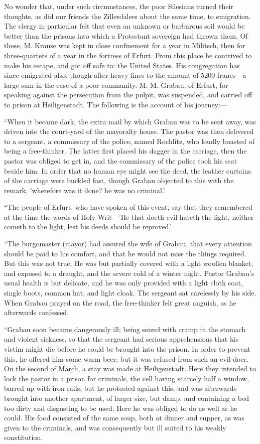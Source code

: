 No wonder that, under such circumstances, the poor
Silesians turned their thoughts, as did our friends the Zillerdalers
about the same time, to emigration. The clergy in particular felt that
even an unknown or barbarous soil would be better than the prisons into
which a Protestant sovereign had thrown them. Of these, M. Krause was
kept in close confinement for a year in Militsch, then for
three-quarters of a year in the fortress of Erfurt. From this place he
contrived to make his escape, and got off safe to: the United States.
His congregation has since emigrated also, though after heavy fines to
the amount of 5200 francs—a large sum in the case of a poor community.
M. M. Grabau, of Erfurt, for speaking against the persecution from the
pulpit, was suspended, and carried off to prison at Heiligenstadt. The
following is the account of his journey:—

``When it became dark, the extra mail
by which Grabau was to be sent away, was driven into the court-yard of
the mayoralty house. The pastor was then delivered to a sergeant, a
commissary of the police, named Rochlitz, who loudly boasted of being a
free-thinker. The latter first placed his dagger in the carriage, then
the pastor was obliged to get in, and the commissary of the police took
his seat beside him. In order that no human
eye might see the deed, the leather curtains of the carriage were
buckled fast, though Grabau objected to this with the remark, 'wherefore
was it done? he was no criminal.'

``The people of Erfurt, who have
spoken of this event, say that they remembered at the time the words of
Holy Writ—'He that doeth evil hateth the light, neither cometh to the
light, lest his deeds should be reproved.'

``The burgomaster (mayor) had assured
the wife of Grabau, that every attention should be paid to his comfort,
and that he would not miss the things required. But this was not true.
He was but partially covered with a light woollen blanket, and exposed
to a draught, and the severe cold of a winter night. Pastor Grabau's
usual health is but delicate, and he was only provided with a light
cloth coat, single boots, common hat, and light cloak. The sergeant sat
carelessly by his side. When Grabau prayed on the road, the free-thinker
felt great anguish, as he afterwards confessed.

``Grabau soon became dangerously ill;
being seized with cramp in the stomach and violent sickness, so that the
sergeant had serious apprehensions that his victim might die before he
could be brought into the prison. In order to prevent this, he offered
him some warm beer; but it was refused from such an evil-doer. On the
second of March, a stay was made at Heiligenstadt. Here they intended to
lock the pastor in a prison for criminals, the cell having scarcely half
a window, barred up with iron rails; but he protested against this, and
was afterwards brought into another apartment, of larger size, but damp,
and containing a bed too dirty and disgusting to be used. Here he was
obliged to do as well as he could. His food consisted of the same soup,
both at dinner and supper, as was given to the criminals, and was
consequently but ill suited to his weakly constitution.

